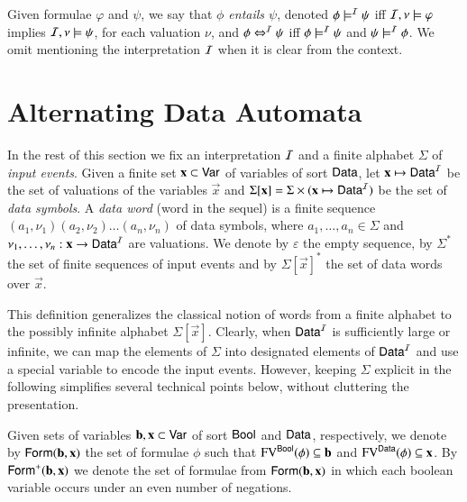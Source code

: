 \documentclass[10pt,conference,letterpaper,twocolumn]{IEEEtran}
\begin{document}
Given formulae $\varphi$ and $\psi$, we say that \emph{$\phi$ entails
  $\psi$}, denoted $\phi \models^{\mathcal{I}} \psi$ iff $\mathcal{I},\nu \models \varphi$
implies $\mathcal{I},\nu \models \psi$, for each valuation $\nu$, and $\phi
\Leftrightarrow^{\mathcal{I}} \psi$ iff $\phi \models^{\mathcal{I}} \psi$ and $\psi \models^{\mathcal{I}} \phi$.
We omit mentioning the interpretation $\mathcal{I}$ when it is clear from the
context.

\section{Alternating Data Automata}

In the rest of this section we fix an interpretation $\mathcal{I}$ and a finite
alphabet $\Sigma$ of \emph{input events}. Given a finite set $\mathbf x
\subset \mathsf{Var}$ of variables of sort $\mathsf{Data}$, let $\mathbf x \mapsto
\mathsf{Data}^{\mathcal{I}}$ be the set of valuations of the variables $\vec{x}$ and
$\Sigma[\mathbf x] = \Sigma \times (\mathbf x \mapsto \mathsf{Data}^{\mathcal{I}})$ be the
set of \emph{data symbols}. A \emph{data word} (word in the sequel) is
a finite sequence $(a_1,\nu_1)(a_2,\nu_2) \ldots (a_n,\nu_n)$ of data
symbols, where $a_1,\ldots,a_n \in \Sigma$ and $\nu_1,\ldots,\nu_n :
\mathbf x \rightarrow \mathsf{Data}^{\mathcal{I}}$ are valuations. We denote by
$\varepsilon$ the empty sequence, by $\Sigma^*$ the set of finite
sequences of input events and by $\Sigma[\vec{x}]^*$ the set of data
words over $\vec{x}$.

This definition generalizes the classical notion of words from a
finite alphabet to the possibly infinite alphabet
$\Sigma[\vec{x}]$. Clearly, when $\mathsf{Data}^{\mathcal{I}}$ is sufficiently large or
infinite, we can map the elements of $\Sigma$ into designated elements
of $\mathsf{Data}^{\mathcal{I}}$ and use a special variable to encode the input
events. However, keeping $\Sigma$ explicit in the following simplifies
several technical points below, without cluttering the presentation.

Given sets of variables $\mathbf b,\mathbf x \subset \mathsf{Var}$ of sort
$\mathsf{Bool}$ and $\mathsf{Data}$, respectively, we denote by
$\mathsf{Form}(\mathbf b,\mathbf x)$ the set of formulae $\phi$ such that
$\mathrm{FV}^{\mathsf{Bool}}(\phi) \subseteq \mathbf b$ and $\mathrm{FV}^{\mathsf{Data}}(\phi) \subseteq
\mathbf x$. By $\mathsf{Form}^+(\mathbf b,\mathbf x)$ we denote the set of formulae
from $\mathsf{Form}(\mathbf b,\mathbf x)$ in which each boolean variable occurs
under an even number of negations.
\end{document}
